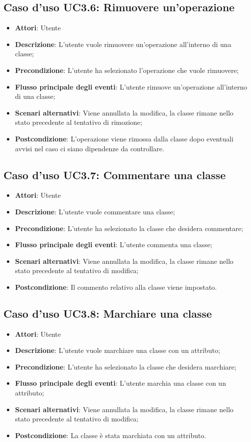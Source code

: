 \documentclass[../AnalisiDeiRequisiti.tex]{subfiles}
\begin{document}
			\subsection{Caso d'uso UC3.6: Rimuovere un'operazione}
			\begin{itemize}
				\item \textbf{Attori}: Utente
				\item \textbf{Descrizione}: L'utente vuole rimuovere un'operazione all'interno di una classe;
				\item \textbf{Precondizione}: L'utente ha selezionato l'operazione che vuole rimuovere;
				\item \textbf{Flusso principale degli eventi}: L'utente rimuove un'operazione all'interno di una classe;
				\item \textbf{Scenari alternativi}: Viene annullata la modifica, la classe rimane nello stato precedente al tentativo di rimozione;
				\item \textbf{Postcondizione}: L'operazione viene rimossa dalla classe dopo eventuali avvisi nel caso ci siano dipendenze da controllare.
			\end{itemize}
			\subsection{Caso d'uso UC3.7: Commentare una classe}
			\begin{itemize}
				\item \textbf{Attori}: Utente
				\item \textbf{Descrizione}: L'utente vuole commentare una classe;
				\item \textbf{Precondizione}: L'utente ha selezionato la classe che desidera commentare;
				\item \textbf{Flusso principale degli eventi}: L'utente commenta una classe;
				\item \textbf{Scenari alternativi}: Viene annullata la modifica, la classe rimane nello stato precedente al tentativo di modifica;
				\item \textbf{Postcondizione}: Il commento relativo alla classe viene impostato.
			\end{itemize}
			\subsection{Caso d'uso UC3.8: Marchiare una classe}
			\begin{itemize}
				\item \textbf{Attori}: Utente
				\item \textbf{Descrizione}: L'utente vuole marchiare una classe con un attributo;
				\item \textbf{Precondizione}: L'utente ha selezionato la classe che desidera marchiare;
				\item \textbf{Flusso principale degli eventi}: L'utente marchia una classe con un attributo;
				\item \textbf{Scenari alternativi}: Viene annullata la modifica, la classe rimane nello stato precedente al tentativo di modifica;
				\item \textbf{Postcondizione}: La classe è stata marchiata con un attributo.
			\end{itemize}
\end{document}
